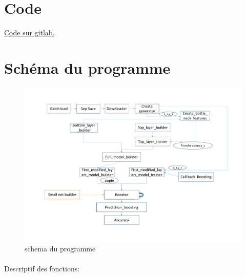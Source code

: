 \documentclass[11 pt]{article}
\begin{document}
\pagebreak
\begin{appendices}
  \section{Code}
    \href{https://gitlab.com/zlanderous/transboost}{Code sur gitlab.}

  \section{Schéma du programme}
  \begin{figure}[h]
    \includegraphics[width=\textwidth]{figTot.pdf}
    \caption{schema du programme}
    \label{figTot}
  \end{figure}
  \paragraph{}Descriptif des fonctions:\\


\end{appendices}
\end{document}
